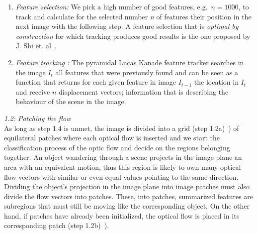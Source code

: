 \begin{enumerate}
	\item \textit{Feature selection: } We pick a high number of good features, e.g.\ $n=1000$, to track and calculate for the selected number \textit{n} of features their position in the next image with the following step. A feature selection that is \textit{optimal by construction} for which tracking produces good results %
	is the one proposed by J. Shi et. al\ \cite{GFT94-06}. %
	\item \textit{Feature tracking :} The pyramidal Lucas Kanade feature tracker searches in the image $I_t$ all features that were previously found \cite{PILKFT99} %
	and can be seen as a function that returns for each given feature in image $I_{t-1}$ the location in $I_{t}$ and receive $n$ displacement vectors; information that is describing the behaviour of the scene in the image.%
\end{enumerate}
%
\textit{1.2: Patching the flow} \\ \newline
As long as step 1.4 is unmet, the image is divided into a grid (step 1.2a)\ ) of equilateral patches where each optical flow is inserted and we start the classification process of the optic flow and decide on the regions belonging together. An object wandering through a scene projects in the image plane an area with an equivalent motion, thus this region is likely to own many optical flow vectors with similar or even equal values pointing to the same direction. Dividing the object's projection in the image plane into image patches must also divide the flow vectors into patches. These, into patches, summarized features are subregions that must still be moving like the corresponding object. \newline
On the other hand, if patches have already been initialized, the optical flow is placed in its corresponding patch (step 1.2b)\ ). \newline
%
